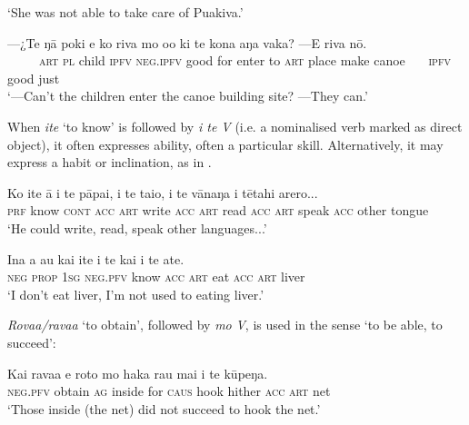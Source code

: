 \glt 
‘She was not able to take care of Puakiva.’ \textstyleExampleref{[R229.003]} 
\z

\ea\label{ex:11.78}
\gll —¿Te ŋā poki e ko riva mo o{\ꞌ}o ki te kona aŋa vaka? —E riva nō.\\
~~~~~\textsc{art} \textsc{pl} child \textsc{ipfv} \textsc{neg.ipfv} good for enter to \textsc{art} place make canoe ~~~\textsc{ipfv} good just\\

\glt 
‘—Can’t the children enter the canoe building site? —They can.’ \textstyleExampleref{[R363.137–138]}
\z

When \textit{{\ꞌ}ite} ‘to know’ is followed by \textit{i te V} (i.e. a nominalised verb marked as direct object), it often expresses ability, often a particular skill. Alternatively, it may express a habit or inclination, as in .

\ea\label{ex:11.79}
\gll Ko {\ꞌ}ite {\ꞌ}ā i te pāpa{\ꞌ}i, i te tai{\ꞌ}o, i te vānaŋa i tētahi {\ꞌ}arero... \\
\textsc{prf} know \textsc{cont} \textsc{acc} \textsc{art} write \textsc{acc} \textsc{art} read \textsc{acc} \textsc{art} speak \textsc{acc} other tongue \\

\glt 
‘He could write, read, speak other languages...’ \textstyleExampleref{[R539-1.052]}
\z

\ea\label{ex:11.80}
\gll {\ꞌ}Ina a au kai {\ꞌ}ite i te kai i te {\ꞌ}ate. \\
\textsc{neg} \textsc{prop} \textsc{1sg} \textsc{neg.pfv} know \textsc{acc} \textsc{art} eat \textsc{acc} \textsc{art} liver \\

\glt 
‘I don’t eat liver, I’m not used to eating liver.’ \textstyleExampleref{[R245.238]} 
\z

\textit{Rova{\ꞌ}a/rava{\ꞌ}a} ‘to obtain’, followed by \textit{mo} \textit{V}, is used in the sense ‘to be able, to succeed’:

\ea\label{ex:11.81}
\gll Kai rava{\ꞌ}a e roto mo haka ra{\ꞌ}u mai i te kūpeŋa.\\
\textsc{neg.pfv} obtain \textsc{ag} inside for \textsc{caus} hook hither \textsc{acc} \textsc{art} net\\

\glt 
‘Those inside (the net) did not succeed to hook the net.’ \textstyleExampleref{[R304.128]} 
\z

